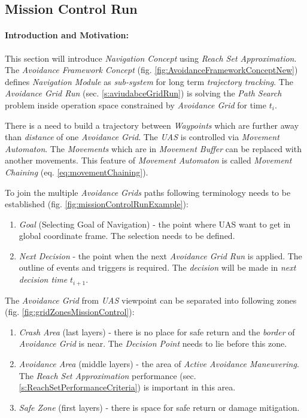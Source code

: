 \newpage
\subsection{Mission Control Run}\label{s:missionControlRun}
\paragraph{Introduction and Motivation:}  This section will introduce \emph{Navigation Concept} using  \emph{Reach Set Approximation}. The \emph{Avoidance Framework Concept} (fig. \ref{fig:AvoidanceFrameworkConceptNew}) defines \emph{Navigation Module} as \emph{sub-system} for long term \emph{trajectory tracking}.  The \emph{Avoidance Grid Run} (sec. \ref{s:aviudabceGridRun}) is solving the \emph{Path Search} problem inside operation space constrained by \emph{Avoidance Grid} for time $t_i$. 

There is a need to build a trajectory between \emph{Waypoints} which are further away than \emph{distance} of one \emph{Avoidance Grid}.  The \emph{UAS} is controlled via \emph{Movement Automaton}. The \emph{Movements} which are in \emph{Movement Buffer} can be replaced with another movements. This feature of \emph{Movement Automaton} is called \emph{Movement Chaining} (eq. \ref{eq:movementChaining}).

To join the multiple \emph{Avoidance Grids} paths following terminology needs to be established (fig. \ref{fig:missionControlRunExample}):
\begin{enumerate}
    \item \emph{Goal} (Selecting Goal of Navigation) - the point where UAS want to get in global coordinate frame. The selection needs to be defined.
    
    \item \emph{Next Decision} - the point when the next \emph{Avoidance Grid Run} is applied. The outline of events and triggers is required. The \emph{decision} will be made in \emph{next decision time} $t_{i+1}$.
\end{enumerate}

\noindent The \emph{Avoidance Grid} from \emph{UAS} viewpoint can be separated into following zones (fig. \ref{fig:gridZonesMissionControl}):
\begin{enumerate}
    \item \emph{Crash Area} (last layers) - there is no place for safe return and the \emph{border} of \emph{Avoidance Grid} is near. The \emph{Decision Point} needs to lie before this zone.
    
    \item \emph{Avoidance Area} (middle layers) - the area of \emph{Active Avoidance Maneuvering}. The \emph{Reach Set Approximation} performance (sec. \ref{s:ReachSetPerformanceCriteria}) is important in this area.
    
    \item \emph{Safe Zone} (first layers) - there is space for safe return or damage mitigation.
\end{enumerate}

